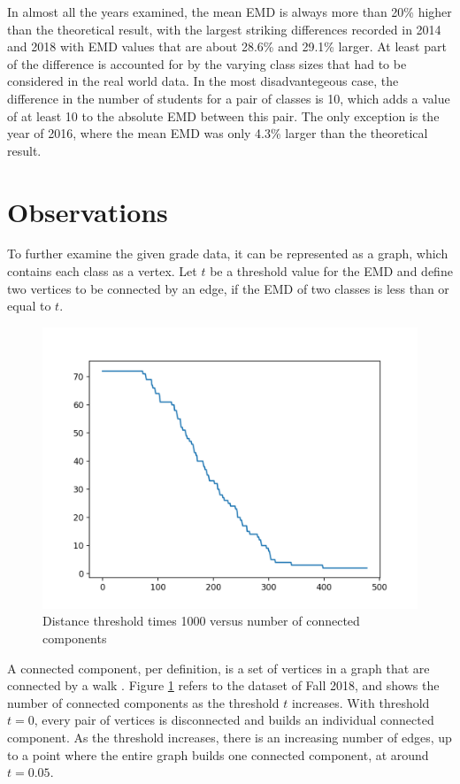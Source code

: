 \documentclass[12pt,letterpaper,oneside,openany]{book}
\begin{document}
In almost all the years examined, the mean EMD is always more than 20\% higher than the theoretical result, with the largest striking differences recorded in 2014 and 2018 with EMD values that are about 28.6\% and 29.1\% larger. At least part of the difference is accounted for by the varying class sizes that had to be considered in the real world data. In the most disadvantegeous case, the difference in the number of students for a pair of classes is 10, which adds a value of at least 10 to the absolute EMD between this pair.
The only exception is the year of 2016, where the mean EMD was only 4.3\% larger than the theoretical result.


\setcounter{section}{1}
\section{Observations}
To further examine the given grade data, it can be represented as a graph, which contains each class as a vertex. Let $t$ be a threshold value for the EMD and define two vertices to be connected by an edge, if the EMD of two classes is less than or equal to $t$.

\begin{figure}
	\centering
	\includegraphics[width=\textwidth]{./images/n2018LLP.png}
	\caption{Distance threshold times 1000 versus number of connected components }
	\label{fig:LLP18}
\end{figure}

A connected component, per definition, is a set of vertices in a graph that are connected by a walk \cite{porter2009communities}. 
Figure \ref{fig:LLP18} refers to the dataset of Fall 2018, and shows the number of connected components as the threshold $t$ increases. With threshold $t=0$, every pair of vertices is disconnected and builds an individual connected component. As the threshold increases, there is an increasing number of edges, up to a point where the entire graph builds one connected component, at around $t=0.05$.
\end{document}

